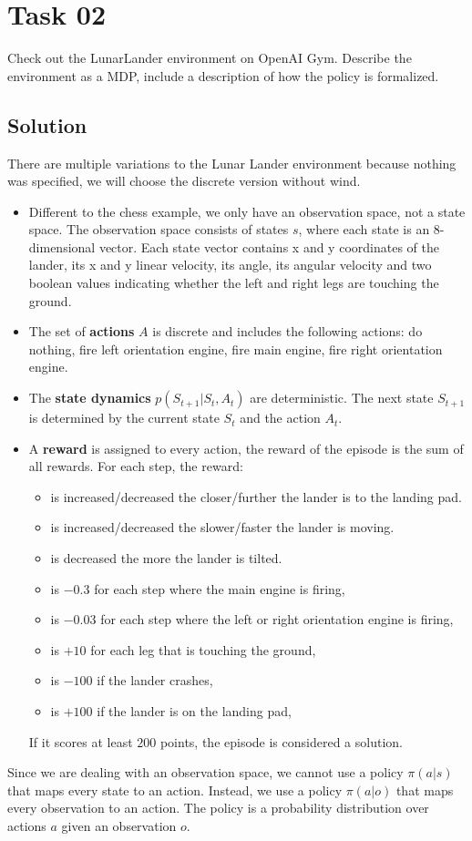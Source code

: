 \documentclass{article}
\begin{document}
\section{Task 02}
Check out the LunarLander environment on OpenAI Gym. Describe the environment as a MDP, 
include a description of how the policy is
formalized.
\subsection{Solution}
There are multiple variations to the Lunar Lander environment \textemdash because nothing was 
specified, we will choose the discrete version without wind.
\begin{itemize}
    \item Different to the chess example, we only have an observation space, not a state space. The observation
    space consists of states $s$, where each state is an 8-dimensional vector. Each state vector contains
    x and y coordinates of the lander, its x and y linear velocity, its angle, its angular velocity and 
    two boolean values indicating whether the left and right legs are touching the ground.
    \item The set of \textbf{actions} $A$ is discrete and includes the following actions: do nothing, fire left orientation engine,
    fire main engine, fire right orientation engine.
    \item The \textbf{state dynamics} $p(S_{t+1} | S_t, A_t)$ are deterministic. The next state $S_{t+1}$ is
    determined by the current state $S_t$ and the action $A_t$.
    \item A \textbf{reward} is assigned to every action, the reward of the episode is the 
    sum of all rewards. For each step, the reward:
    \begin{itemize}
        \item is increased/decreased the closer/further the lander is to the landing pad.
        \item is increased/decreased the slower/faster the lander is moving.
        \item is decreased the more the lander is tilted.
        \item is $-0.3$ for each step where the main engine is firing,
        \item is $-0.03$ for each step where the left or right orientation engine is firing,
        \item is $+10$ for each leg that is touching the ground,
        \item is $-100$ if the lander crashes,
        \item is $+100$ if the lander is on the landing pad,
    \end{itemize}
    If it scores at least $200$ points, the episode is considered a solution.
\end{itemize}
Since we are dealing with an observation space, we cannot use a policy $\pi(a|s)$ that maps every state
to an action. Instead, we use a policy $\pi(a|o)$ that maps every observation to an action. The policy
is a probability distribution over actions $a$ given an observation $o$.
\end{document}
